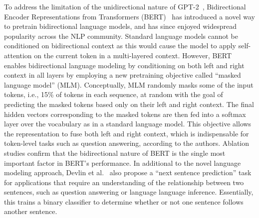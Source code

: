 To address the limitation of the unidirectional nature of GPT-2~\cite{radford2019language}, Bidirectional Encoder Representations from Transformers (BERT)~\cite{devlin2018bert} has introduced a novel way to pretrain bidirectional language models, and has since enjoyed widespread popularity across the NLP community.
Standard language models cannot be conditioned on bidirectional context as this would cause the model to apply self-attention on the current token in a multi-layered context.
However, BERT enables bidirectional language modeling by conditioning on both left and right context in all layers by employing a new pretraining objective called ``masked language model'' (MLM).
Conceptually, MLM randomly masks some of the input tokens, i.e., 15\% of tokens in each sequence, at random with the goal of predicting the masked tokens based only on their left and right context.
The final hidden vectors corresponding to the masked tokens are then fed into a softmax layer over the vocabulary as in a standard language model.
This objective allows the representation to fuse both left and right context, which is indispensable for token-level tasks such as question answering, according to the authors.
Ablation studies confirm that the bidirectional nature of BERT is the single most important factor in BERT's performance.
In additional to the novel language modeling approach, Devlin et al.~\cite{devlin2018bert} also propose a ``next sentence prediction'' task for applications that require an understanding of the relationship between two sentences, such as question answering or language language inference.
Essentially, this trains a binary classifier to determine whether or not one sentence follows another sentence.


